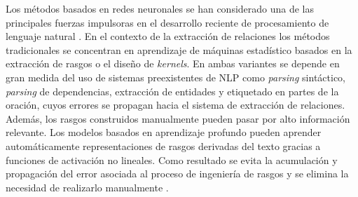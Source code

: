 
Los métodos basados en redes neuronales se han considerado una
de las principales fuerzas impulsoras en el desarrollo reciente de
procesamiento de lenguaje natural \cite{lu2016recent,socher2012deep}. En el contexto de la extracción de relaciones los métodos tradicionales se concentran  en aprendizaje de máquinas estadístico basados en la extracción de rasgos o el diseño de \textit{kernels}. En ambas variantes se depende en gran medida del uso de sistemas preexistentes de NLP como \textit{parsing} sintáctico, \textit{parsing} de dependencias, extracción de entidades y etiquetado en partes de la oración, cuyos errores se propagan hacia el sistema de extracción de relaciones. Además, los rasgos construidos manualmente pueden pasar por alto información relevante. Los modelos basados en aprendizaje profundo pueden aprender automáticamente representaciones de rasgos derivadas del texto gracias a funciones de activación no lineales. Como resultado se evita la acumulación y propagación del  error asociada al proceso de ingeniería de rasgos y se elimina la necesidad de realizarlo manualmente \cite{liu2020survey}.   








